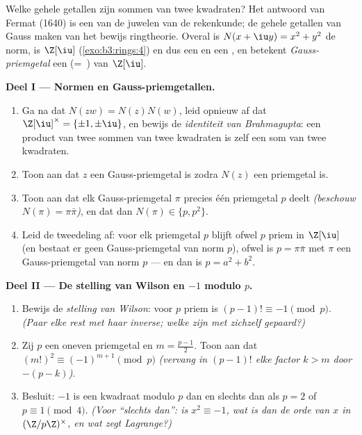\begin{problem}\label{pb:b3:rings:1}
Welke gehele getallen zijn sommen van twee kwadraten? Het antwoord
van Fermat (1640) is een van de juwelen van de rekenkunde; de
gehele getallen van Gauss maken van het bewijs ringtheorie. Overal
is $N(x + \iu y) = x^2 + y^2$ de norm, is $\Z[\iu]$ 
(\cref{exo:b3:rings:4}) en dus een  en een , en
betekent \emph{Gauss-priemgetal} een  (=\ ) van $\Z[\iu]$.

\medskip
\noindent\textbf{Deel I --- Normen en Gauss-priemgetallen.}
\begin{enumerate}
  \item Ga na dat $N(zw) = N(z)N(w)$, leid opnieuw af dat
        $\Z[\iu]^\times = \{\pm1, \pm\iu\}$, en bewijs de
        \emph{identiteit van Brahmagupta}: een product van twee
        sommen van twee kwadraten is zelf een som van twee
        kwadraten.
  \item Toon aan dat $z$ een Gauss-priemgetal is zodra $N(z)$ een
        priemgetal is.
  \item Toon aan dat elk Gauss-priemgetal $\pi$ precies één
        priemgetal $p$ deelt \emph{(beschouw $N(\pi) =
        \pi\bar\pi$)}, en dat dan $N(\pi) \in \{p, p^2\}$.
  \item Leid de tweedeling af: voor elk priemgetal $p$ blijft
        ofwel $p$ priem in $\Z[\iu]$ (en bestaat er geen
        Gauss-priemgetal van norm $p$), ofwel is $p = \pi\bar\pi$
        met $\pi$ een Gauss-priemgetal van norm $p$ --- en dan is
        $p = a^2 + b^2$.
\end{enumerate}

\medskip
\noindent\textbf{Deel II --- De stelling van Wilson en $-1$ modulo
$p$.}
\begin{enumerate}[resume]
  \item Bewijs de \emph{stelling van Wilson}: voor $p$ priem is
        $(p-1)! \equiv -1 \pmod p$. \emph{(Paar elke rest met haar
        inverse; welke zijn met zichzelf gepaard?)}
  \item Zij $p$ een oneven priemgetal en $m = \frac{p-1}2$. Toon
        aan dat $(m!)^2 \equiv (-1)^{m+1} \pmod p$ \emph{(vervang
        in $(p-1)!$ elke factor $k > m$ door $-(p - k)$)}.
  \item Besluit: $-1$ is een kwadraat modulo $p$ dan en slechts dan
        als $p = 2$ of $p \equiv 1 \pmod 4$. \emph{(Voor ``slechts
        dan'': is $x^2 \equiv -1$, wat is dan de orde van $x$ in
        $(\Z/p\Z)^\times$, en wat zegt Lagrange?)}
\end{enumerate}


\end{problem}
